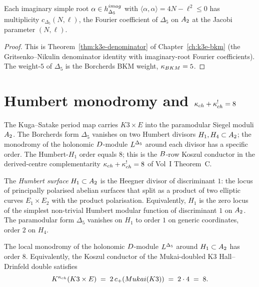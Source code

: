 \begin{corollary}
\label{gluing:cor:imaginary-seeded}
Each imaginary simple root $\alpha \in h^{imag}_{\Delta_5}$
with $\langle \alpha, \alpha\rangle = 4N - \ell^2 \leq 0$ has
multiplicity $c_{\Delta_5}(N, \ell)$, the Fourier coefficient of
$\Delta_5$ on $A_2$ at the Jacobi parameter $(N, \ell)$.
\end{corollary}

\begin{proof}
This is Theorem~\ref{thm:k3e-denominator} of
Chapter~\ref{ch:k3e-bkm} (the Gritsenko--Nikulin denominator identity
with imaginary-root Fourier coefficients). The weight-$5$ of
$\Delta_5$ is the Borcherds BKM weight, $\kappa_{BKM} = 5$.
\end{proof}

\section{Humbert monodromy and $\kappa_{ch} + \kappa_{ch}^! = 8$}
\label{gluing:sec:k3xe-humbert}

The Kuga--Satake period map carries $K3 \times E$ into the
paramodular Siegel moduli $A_2$. The Borcherds form
$\Delta_5$ vanishes on two Humbert divisors $H_1, H_4 \subset
A_2$; the monodromy of the holonomic
$D$-module $L^{\Delta_5}$ around each divisor has a specific
order. The Humbert-$H_1$ order equals $8$; this is the $B$-row
Koszul conductor in the derived-centre complementarity
$\kappa_{ch} + \kappa_{ch}^! = 8$ of Vol~I Theorem~C.

\begin{definition}
\label{gluing:def:humbert-H1}
The \emph{Humbert surface} $H_1 \subset A_2$ is the
Heegner divisor of discriminant $1$: the locus of principally
polarised abelian surfaces that split as a product of two elliptic
curves $E_1 \times E_2$ with the product polarisation. Equivalently,
$H_1$ is the zero locus of the simplest non-trivial Humbert
modular function of discriminant $1$ on $A_2$. The
paramodular form $\Delta_5$ vanishes on $H_1$ to order $1$ on
generic coordinates, order $2$ on $H_4$.
\end{definition}

\begin{theorem}
\label{gluing:thm:humbert-order-8}
The local monodromy of the holonomic $D$-module $L^{\Delta_5}$
around $H_1 \subset A_2$ has order $8$. Equivalently,
the Koszul conductor of the Mukai-doubled K3 Hall--Drinfeld double
satisfies
\[
 K^{\kappa_{ch}}(K3 \times E) \;=\; 2\, c_+(Mukai(K3))
 \;=\; 2 \cdot 4 \;=\; 8.
\]
\end{theorem}

